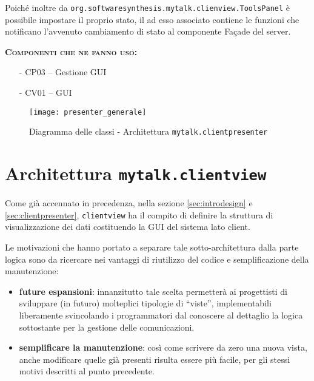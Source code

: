 \begin{itemize}
\begin{description}
Poiché inoltre da \texttt{org.softwaresynthesis.mytalk.clienview.ToolsPanel} è possibile impostare il proprio stato, il  ad esso associato contiene le funzioni che notificano l'avvenuto cambiamento di stato al componente \textsf{Façade del server}.

	\item{\scshape\bfseries Componenti che ne fanno uso:}
	\begin{itemize}[noitemsep,nolistsep]
	  \item[-] \textsf{CP03 -- Gestione GUI}
	  \item[-] \textsf{CV01 -- GUI}
	\end{itemize}
\end{description}

\end{itemize}

\begin{figure}[H]
  \centering
  \texttt{[image: presenter\_generale]}
  \caption{Diagramma delle classi - Architettura \texttt{mytalk.clientpresenter}}\label{fig:sottoarchpresenter}
  \end{figure}
\clearpage

\section{Architettura \texttt{mytalk.clientview}}\label{sec:clientview}
Come già accennato in precedenza, nella sezione \ref{sec:introdesign} e \ref{sec:clientpresenter}, \texttt{clientview} ha il compito di definire la struttura di visualizzazione dei dati costituendo la GUI del sistema lato client.

Le motivazioni che hanno portato a separare tale sotto-architettura dalla parte logica sono da ricercare nei vantaggi di riutilizzo del codice e semplificazione della manutenzione:
\begin{itemize}
 	\item \textbf{future espansioni}: innanzitutto tale scelta permetterà ai progettisti di sviluppare (in futuro) molteplici tipologie di ``viste'', implementabili liberamente svincolando i programmatori dal conoscere al dettaglio la logica sottostante per la gestione delle comunicazioni.
 	\item \textbf{semplificare la manutenzione}: così come scrivere da zero una nuova vista, anche modificare quelle già presenti risulta essere più facile, per gli stessi motivi descritti al punto precedente.
\end{itemize}

